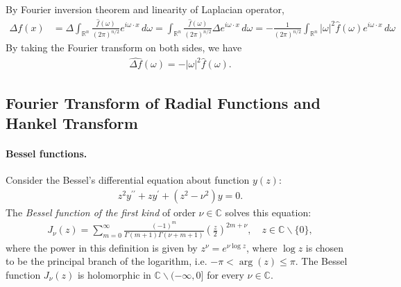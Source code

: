 \documentclass{article}
\numberwithin{equation}{section}
\newcommand{\bbC}{\mathbb{C}}
\newcommand{\bbR}{\mathbb{R}}
\newcommand{\wh}{\widehat}
\theoremstyle{plain}
\theoremstyle{definition}
\begin{document}
By Fourier inversion theorem and linearity of Laplacian operator,
\begin{align*}
	\Delta f(x)&=\Delta\int_{\bbR^n}\frac{\wh{f}(\omega)}{(2\pi)^{n/2}}e^{i\omega\cdot x}\,d\omega=\int_{\bbR^n}\frac{\wh{f}(\omega)}{(2\pi)^{n/2}}\Delta e^{i\omega\cdot x}\,d\omega=-\frac{1}{(2\pi)^{n/2}}\int_{\bbR^n}\vert\omega\vert^2\wh{f}(\omega)e^{i\omega\cdot x}\,d\omega
\end{align*}
By taking the Fourier transform on both sides, we have
\begin{align*}
	\wh{\Delta f}(\omega)=-\vert\omega\vert^2\wh{f}(\omega).
\end{align*}

\newpage
\subsection{Fourier Transform of Radial Functions and Hankel Transform}
\paragraph{Bessel functions.} Consider the Bessel's differential equation about function $y(z)$:
\begin{align}
	z^2y^{\prime\prime}+zy^{\prime}+(z^2-\nu^2)y=0.\label{besseldiff}
\end{align}
The \textit{Bessel function of the first kind} of order $\nu\in\bbC$ solves this equation:
\begin{align*}
	J_\nu(z)=\sum_{m=0}^\infty\frac{(-1)^m}{\Gamma(m+1)\Gamma(\nu+m+1)}\left(\frac{z}{2}\right)^{2m+\nu},\quad z\in\bbC\backslash\{0\},
\end{align*}
where the power in this definition is given by $z^\nu=e^{\nu\log z}$, where $\log z$ is chosen to be the principal branch of the logarithm, i.e. $-\pi<\arg(z)\leq\pi$. The Bessel function $J_{\nu}(z)$ is holomorphic in $\bbC\backslash(-\infty,0]$ for every $\nu\in\bbC$. 
\end{document}

